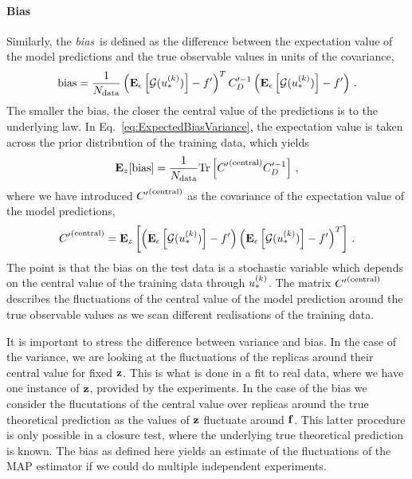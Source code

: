 \paragraph{Bias}

Similarly, the {\em bias}\ is defined as the difference between the expectation
value of the model predictions and the true observable values in units of the
covariance, \ie 
\begin{equation}
    \label{eq:BiasDef}
    {\rm bias} = \frac{1}{N_{\rm data}}
    \left( \mathbf{E}_{\epsilon}\left[ \mathcal{G}(u_*^{(k)}) \right] - f^\prime \right)^T
        C_D^{\prime -1}
    \left( \mathbf{E}_{\epsilon}\left[ \mathcal{G}(u_*^{(k)}) \right] - f^\prime \right)\, .
\end{equation}
The smaller the bias, the closer the central value of the predictions is to the
underlying law. In Eq.~\ref{eq:ExpectedBiasVariance}, the expectation value is
taken across the prior distribution of the training data, which yields
\begin{equation}
    \mathbf{E}_{z}[{\rm bias}] = \frac{1}{N_{\rm data}}
    {\rm Tr} \left[ {{C}^{\prime}}^{(\rm central)} C_D^{\prime -1}{} \right]\, ,
\end{equation}
where we have introduced ${{C}^{\prime}}^{(\rm central)}$ as the covariance of the expectation value
of the model predictions,
\begin{equation}
    \label{eq:CovCentDef}
    {{C}^{\prime}}^{(\rm central)} = 
    \mathbf{E}_{z}\left[
        \left( \mathbf{E}_{\epsilon}\left[ \mathcal{G}(u_*^{(k)}) \right] - f^\prime \right)
        \left( \mathbf{E}_{\epsilon}\left[ \mathcal{G}(u_*^{(k)}) \right] - f^\prime \right)^T   
    \right]\, .
\end{equation}
The point is that the bias on the test data is a stochastic variable which
depends on the central value of the training data through $u_*^{(k)}$. The
matrix ${{C}^{\prime}}^{(\rm central)}$ describes the fluctuations of the central value of the model
prediction around the true observable values as we scan different realisations
of the training data. 

It is important to stress the difference between variance and bias. In the case
of the variance, we are looking at the fluctuations of the replicas around their
central value for fixed $\mathbf{z}$. This is what is done in a fit to real
data, where we have one instance of $\mathbf{z}$, provided by the experiments.
In the case of the bias we consider the flucutations of the central value over
replicas around the true theoretical prediction as the values of $\mathbf{z}$
fluctuate around $\mathbf{f}$. This latter procedure is only possible in a
closure test, where the underlying true theoretical prediction is known. The
bias as defined here yields an estimate of the fluctuations of the MAP estimator
if we could do multiple independent experiments. 

